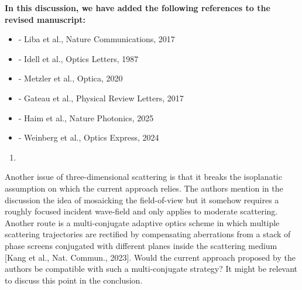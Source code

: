 \documentclass[12pt]{article}
\newenvironment{solved_reviewercomment}
    {\begin{tcolorbox}[width=\linewidth,colback=gray!5,colframe=solved_commentcolor!50,title=Reviewer Comment,left=5pt,right=5pt]}
    {\end{tcolorbox}}
\newenvironment{finished_ourresponse}
    {\begin{tcolorbox}[width=\linewidth,breakable,enhanced,colback=gray!5,colframe=finished_responsecolor!50,title=Response,left=5pt,right=5pt]}
    {\end{tcolorbox}}
\begin{document}
\begin{finished_ourresponse}
\textbf{In this discussion, we have added the following references to the revised manuscript:}
\begin{itemize}[nosep]
\item \cite{liba2017speckle} - Liba et al., Nature Communications, 2017
\item \cite{idell1987image} - Idell et al., Optics Letters, 1987
\item \cite{metzler2020deepinverse} - Metzler et al., Optica, 2020
\item \cite{gateau2017complementary} - Gateau et al., Physical Review Letters, 2017
\item \cite{haim2025image} - Haim et al., Nature Photonics, 2025
\item \cite{weinberg2024ptychographic} - Weinberg et al., Optics Express, 2024
\end{itemize}

\end{finished_ourresponse}


\begin{enumerate}[label=\arabic*., resume]
\item \leavevmode
\end{enumerate}
\vspace{-1em}
\begin{solved_reviewercomment}
    Another issue of three-dimensional scattering is that it breaks the isoplanatic assumption on which the current approach relies. The authors mention in the discussion the idea of mosaicking the field-of-view but it somehow requires a roughly focused incident wave-field and only applies to moderate scattering. Another route is a multi-conjugate adaptive optics scheme in which multiple scattering trajectories are rectified by compensating aberrations from a stack of phase screens conjugated with different planes inside the scattering medium [Kang et al., Nat. Commun., 2023]. Would the current approach proposed by the authors be compatible with such a multi-conjugate strategy? It might be relevant to discuss this point in the conclusion.
\end{solved_reviewercomment}
\end{document}
